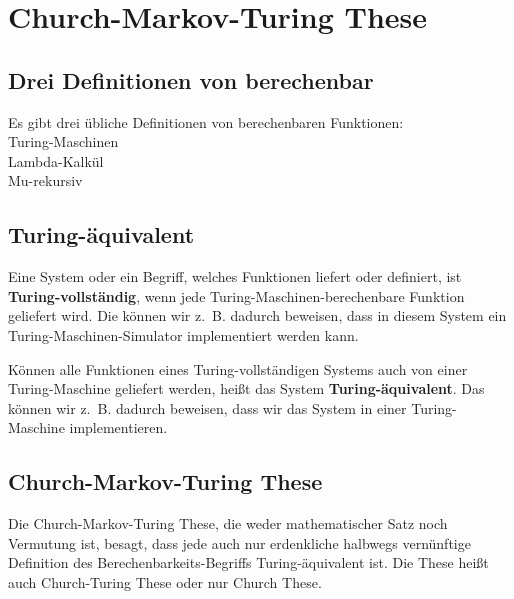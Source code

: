 \documentclass[a4paper]{amsart}
\theoremstyle{definition}
\begin{document}
\section{Church-Markov-Turing These}
\subsection{Drei Definitionen von berechenbar}
Es gibt drei übliche Definitionen von berechenbaren Funktionen:\\
Turing-Maschinen\\
Lambda-Kalkül\\
Mu-rekursiv

\subsection{Turing-äquivalent}
Eine System oder ein Begriff, welches Funktionen liefert oder definiert, ist \textbf{Turing-vollständig}, wenn jede Turing-Maschinen-berechenbare Funktion geliefert wird. Die können wir z.~B. dadurch beweisen, dass in diesem System ein Turing-Maschinen-Simulator implementiert werden kann.

Können alle Funktionen eines Turing-vollständigen Systems auch von einer Turing-Maschine geliefert werden, heißt das System \textbf{Turing-äquivalent}. Das können wir z.~B. dadurch beweisen, dass wir das System in einer Turing-Maschine implementieren.

\subsection{Church-Markov-Turing These}
Die Church-Markov-Turing These, die weder mathematischer Satz noch Vermutung ist, besagt, dass jede auch nur erdenkliche halbwegs vernünftige Definition des Berechenbarkeits-Begriffs Turing-äquivalent ist.  Die These heißt auch Church-Turing These oder nur Church These.
\end{document}
